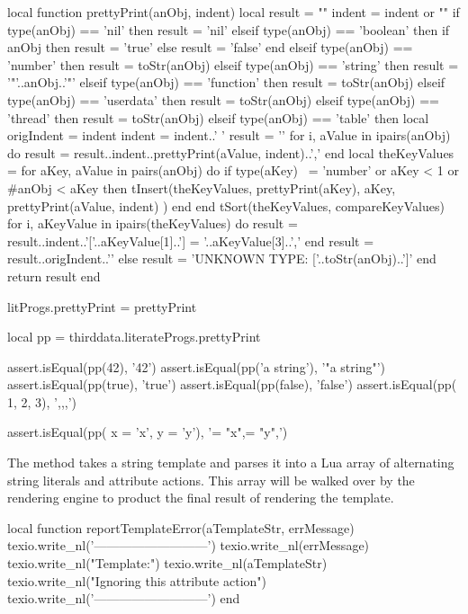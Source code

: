 local function prettyPrint(anObj, indent)
  local result = ""
  indent = indent or ""
  if type(anObj) == 'nil' then
    result = 'nil'
  elseif type(anObj) == 'boolean' then
    if anObj then result = 'true' else result = 'false' end
  elseif type(anObj) == 'number' then
    result = toStr(anObj)
  elseif type(anObj) == 'string' then
    result = '"'..anObj..'"'
  elseif type(anObj) == 'function' then
    result = toStr(anObj)
  elseif type(anObj) == 'userdata' then
    result = toStr(anObj)
  elseif type(anObj) == 'thread' then
    result = toStr(anObj)
  elseif type(anObj) == 'table' then
    local origIndent = indent
    indent = indent..'  '
    result = '{\n'
    for i, aValue in ipairs(anObj) do
      result = result..indent..prettyPrint(aValue, indent)..',\n'
    end
    local theKeyValues = { }
    for aKey, aValue in pairs(anObj) do
      if type(aKey) ~= 'number' or aKey < 1 or #anObj < aKey then
        tInsert(theKeyValues,
          { prettyPrint(aKey), aKey, prettyPrint(aValue, indent) })
      end
    end
    tSort(theKeyValues, compareKeyValues)
    for i, aKeyValue in ipairs(theKeyValues) do
      result = result..indent..'['..aKeyValue[1]..'] = '..aKeyValue[3]..',\n'
    end
    result = result..origIndent..'}'
  else
    result = 'UNKNOWN TYPE: ['..toStr(anObj)..']'
  end
  return result
end

litProgs.prettyPrint = prettyPrint
\stopLuaCode


\startLuaTest
local pp = thirddata.literateProgs.prettyPrint

assert.isEqual(pp(42),         '42')
assert.isEqual(pp('a string'), '"a string"')
assert.isEqual(pp(true),       'true')
assert.isEqual(pp(false),      'false')
assert.isEqual(pp({ 1, 2, 3}), '{,,,\n}')

assert.isEqual(pp({ x = 'x', y = 'y'}),
  '{\n  ["x"] = "x",\n  ["y"] = "y",\n}')
\stopLuaTest
\stopTestCase
\stopTestSuite

\startTestSuite[parseTemplate]

The  method takes a string template and parses it into 
a Lua array of alternating string literals and attribute actions. This 
array will be walked over by the  rendering engine to 
product the final result of rendering the template. 

\startLuaCode
local function reportTemplateError(aTemplateStr, errMessage)
  texio.write_nl('---------------------------')
  texio.write_nl(errMessage)
  texio.write_nl("Template:")
  texio.write_nl(aTemplateStr)
  texio.write_nl("Ignoring this attribute action")
  texio.write_nl('---------------------------')
end

